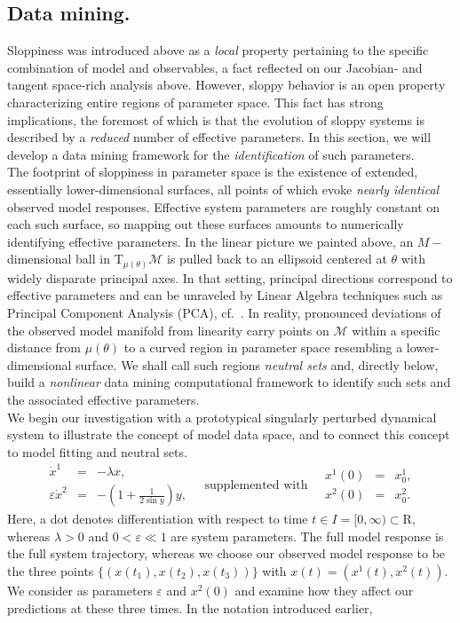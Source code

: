 \documentclass{article}
\newcommand{\eps}{\varepsilon}
\newcommand{\p}{\theta}
\newcommand{\omr}{\mu}
\newcommand{\omm}{\mathcal{M}}
\newcommand{\R}{\mathrm{R}}
\newcommand{\be}{\begin{equation}}
\newcommand{\ee}{\end{equation}}
\begin{document}
\subsection{Data mining.}
%
Sloppiness was introduced above as a \emph{local} property
pertaining to the specific combination of model and observables,
a fact reflected on our Jacobian- and tangent space-rich analysis above.
However, sloppy behavior is an open property
characterizing entire regions of parameter space.
This fact has strong implications,
the foremost of which is that the evolution of sloppy systems
is described by a \emph{reduced} number of effective parameters.
In this section, we will develop a data mining framework
for the \emph{identification} of such parameters.\\

The footprint of sloppiness in parameter space is the existence of
extended, essentially lower-dimensional surfaces, all points of which
evoke \emph{nearly identical} observed model responses.  Effective
system parameters are roughly constant on each such surface, so
mapping out these surfaces amounts to numerically identifying
effective parameters.  In the linear picture we painted above, an
$M-$dimensional ball in $\mathrm{T}_{\omr(\p)}\omm$ is pulled back to
an ellipsoid centered at $\p$ with widely disparate principal axes.
In that setting, principal directions correspond to effective
parameters and can be unraveled by Linear Algebra techniques such as
Principal Component Analysis (PCA), cf.~\cite{ADS06}.  In reality,
pronounced deviations of the observed model manifold from linearity
carry points on $\omm$ within a specific distance from $\omr(\p)$ to a
curved region in parameter space resembling a lower-dimensional
surface.  We shall call such regions \emph{neutral sets} and, directly
below, build a \emph{nonlinear} data mining computational framework
to identify such sets and the associated effective parameters.\\

We begin our investigation with a prototypical singularly perturbed
dynamical system to illustrate the concept of model data space, and to
connect this concept to model fitting and neutral sets.
%
\be
\begin{array}{rcl}
 \dot{x}^1 &=& -\lambda x ,
\\
 \eps \dot{x}^2 &=& -\displaystyle\left(1+\frac{1}{2\sin y}\right) y ,
\end{array}
\quad\mbox{supplemented with}\quad
\begin{array}{rcl}
 x^1(0) &=& x^1_0 ,
\\
 x^2(0) &=& x^2_0 .
\end{array}
\ee
%
Here, a dot denotes differentiation with respect to time
$t \in I = [0,\infty) \subset \R$, whereas $\lambda > 0$ and
$0 < \eps \ll 1$ are system parameters.  The full model response is
the full system trajectory, whereas we choose our observed model
response to be the three points $\{(x(t_1), x(t_2), x(t_3))\}$ with
$x(t) = (x^1(t), x^2(t))$. We consider as parameters $\eps$ and
$x^2(0)$ and examine how they affect our predictions at these three
times. In the notation introduced earlier,
\end{document}

